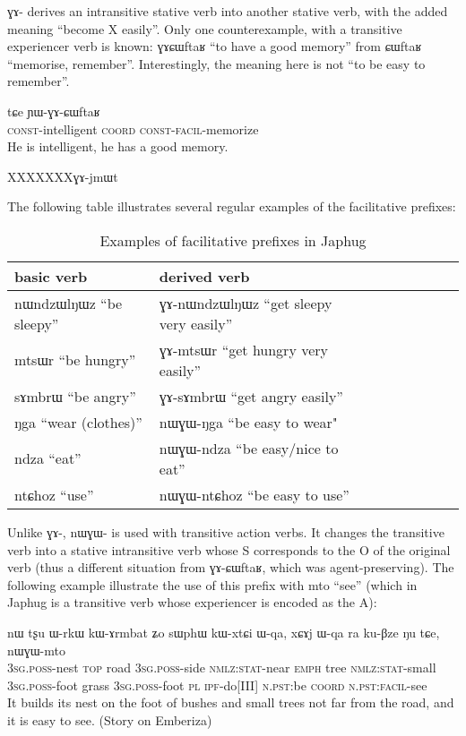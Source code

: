 \documentclass[oldfontcommands,oneside,a4paper,11pt]{memoir}
\newcommand{\ipa}[1]{{\phon #1}} %
\newcommand{\coord}{\textsc{coord}}
\newcommand{\const}{\textsc{const}}
\newcommand{\emphat}{\textsc{emph}}
\newcommand{\ipf}{\textsc{ipf}}
\newcommand{\nmlz}{\textsc{nmlz}}
\newcommand{\npst}{\textsc{n.pst}}
\newcommand{\pl}{\textsc{pl}}
\newcommand{\poss}{\textsc{poss}}
\newcommand{\sg}{\textsc{sg}}
\newcommand{\stat}{\textsc{stat}}
\newcommand{\topic}{\textsc{top}}
\newcommand{\facil}{\textsc{facil}}
\begin{document}
\ipa{ɣɤ-} derives an intransitive stative verb   into another stative verb, with the added meaning ``become X easily''. Only one counterexample, with a transitive experiencer verb is known: \ipa{ɣɤɕɯftaʁ} ``to have a good memory'' from \ipa{ɕɯftaʁ} ``memorise, remember''. Interestingly, the meaning here is not ``to be easy to remember''.
\begin{exe}
\ex 
\gll   \ipa{ɲɯ-ɕqraʁ} 	\ipa{tɕe} 	\ipa{ɲɯ-ɣɤ-ɕɯftaʁ} 	   \\
  \const{}-intelligent \coord{} \const{}-\facil{}-memorize \\
 \glt   He is intelligent, he has a good memory.
   \end{exe}
   XXXXXXXɣɤ-jmɯt
   
   
The following table illustrates several regular examples of the facilitative prefixes:

\begin{table}[H]
\caption{Examples of facilitative prefixes in Japhug}\label{tab:facilitative}
\begin{tabular}{lllllllll} \toprule
basic verb  & derived  verb &\\
\midrule
 \ipa{nɯndzɯlŋɯz} ``be sleepy'' &  \ipa{ɣɤ-nɯndzɯlŋɯz} ``get sleepy very easily'' \\
\ipa{mtsɯr} ``be hungry'' &  \ipa{ɣɤ-mtsɯr} ``get hungry very easily'' \\
\ipa{sɤmbrɯ} ``be angry'' &  \ipa{ɣɤ-sɤmbrɯ} ``get angry  easily'' \\
 \midrule
 \ipa{ŋga} ``wear (clothes)'' & \ipa{nɯɣɯ-ŋga} ``be easy to wear" \\
\ipa{ndza} ``eat'' &  \ipa{nɯɣɯ-ndza} ``be easy/nice to eat'' \\
\ipa{ntɕhoz} ``use'' & \ipa{nɯɣɯ-ntɕhoz} ``be easy to use'' \\
\bottomrule
\end{tabular}
\end{table}

 Unlike \ipa{ɣɤ-}, \ipa{nɯɣɯ-} is used with transitive action verbs. It changes the transitive verb into a stative intransitive verb whose S corresponds to the O of the original verb (thus a different situation from  \ipa{ɣɤ-ɕɯftaʁ}, which was agent-preserving). The following example illustrate the use of this prefix with \ipa{mto} ``see'' (which in Japhug is a transitive verb whose experiencer is encoded as the A):
 
 \begin{exe}
\ex 
\gll   \ipa{ɯ-loʁ} 	\ipa{nɯ} 	\ipa{tʂu} 	\ipa{ɯ-rkɯ} 	\ipa{kɯ-ɤrmbat} 	\ipa{ʑo} 	\ipa{sɯphɯ} 	\ipa{kɯ-xtɕi} 	\ipa{ɯ-qa,} 	\ipa{xɕɤj} 	\ipa{ɯ-qa} 	\ipa{ra} 	\ipa{ku-βze} 	\ipa{ŋu} 	\ipa{tɕe,} 	\ipa{nɯɣɯ-mto}  \\
3\sg{}.\poss{}-nest \topic{} road 3\sg{}.\poss{}-side \nmlz{}:\stat{}-near \emphat{} tree \nmlz{}:\stat{}-small 3\sg{}.\poss{}-foot grass 3\sg{}.\poss{}-foot \pl{} \ipf{}-do[III] \npst{}:be \coord{} \npst{}:\facil{}-see \\
 \glt   It builds its nest on the foot of bushes and small trees not far from the road, and it  is easy to see. (Story on Emberiza)
   \end{exe}
  
\end{document}
